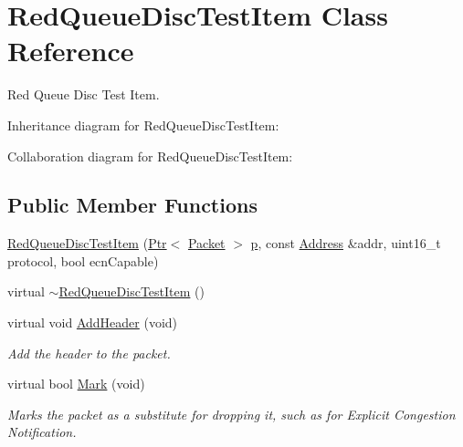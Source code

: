 \hypertarget{classRedQueueDiscTestItem}{}\section{Red\+Queue\+Disc\+Test\+Item Class Reference}
\label{classRedQueueDiscTestItem}


Red Queue Disc Test Item.  




Inheritance diagram for Red\+Queue\+Disc\+Test\+Item\+:


Collaboration diagram for Red\+Queue\+Disc\+Test\+Item\+:
\subsection*{Public Member Functions}
\begin{DoxyCompactItemize}
\item 
\hyperlink{classRedQueueDiscTestItem_a885cc290e9e27214536980aa7b20a692}{Red\+Queue\+Disc\+Test\+Item} (\hyperlink{classns3_1_1Ptr}{Ptr}$<$ \hyperlink{classns3_1_1Packet}{Packet} $>$ \hyperlink{lte__link__budget__x2__handover__measures_8m_ac9de518908a968428863f829398a4e62}{p}, const \hyperlink{classns3_1_1Address}{Address} \&addr, uint16\+\_\+t protocol, bool ecn\+Capable)
\item 
virtual \hyperlink{classRedQueueDiscTestItem_a3ce994c4523b79b427045503343c7eed}{$\sim$\+Red\+Queue\+Disc\+Test\+Item} ()
\item 
virtual void \hyperlink{classRedQueueDiscTestItem_a98f5508ac4e9bd574783351b1594151a}{Add\+Header} (void)
\begin{DoxyCompactList}\small\item\em Add the header to the packet. \end{DoxyCompactList}\item 
virtual bool \hyperlink{classRedQueueDiscTestItem_afb6386624c733e286425eb88facc7728}{Mark} (void)
\begin{DoxyCompactList}\small\item\em Marks the packet as a substitute for dropping it, such as for Explicit Congestion Notification. \end{DoxyCompactList}\end{DoxyCompactItemize}
